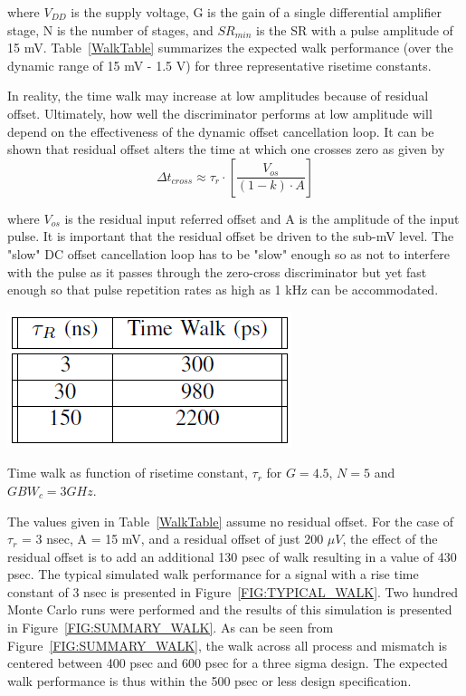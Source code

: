 \documentclass[12pt,oneside,final]{siuethesis}
\theoremstyle{definition}
\begin{document}
where $V_{DD}$ is the supply voltage, G is the gain of a single differential amplifier stage, N is the number of stages, and $SR_{min}$ is  the SR with a pulse amplitude of 15 mV.   Table~\ref{WalkTable} summarizes the expected walk performance (over the dynamic range of 15 mV - 1.5 V) for three representative risetime constants.
\par In reality, the time walk may increase at low amplitudes because of residual offset.  Ultimately, how well the discriminator performs at low amplitude will depend on the effectiveness of the dynamic offset cancellation loop. It can be shown that residual offset alters the time at which one crosses zero as given by
\begin{equation}
\Delta t_{cross} \approx \tau_r \cdot \left[ \frac{V_{os}}{(1-k) \cdot A} \right]
\end{equation}

where $V_{os}$ is the residual input referred offset and A is the amplitude of the input pulse. It is important that the residual offset be driven to the sub-mV level.  The "slow" DC offset cancellation loop has to be "slow" enough so as not to interfere with the pulse as it passes through the zero-cross discriminator but yet fast enough so that pulse repetition rates as high as 1 kHz can be accommodated. 

\begin{table}[htbp!]
 \centering
 \includegraphics[scale=.7,keepaspectratio=true]{./ch4_figures/walk_table.png}
\caption{Time walk as function of risetime constant, $\tau_r$ for $G = 4.5$, $N = 5$ and $GBW_{c} = 3 GHz$.}
\label{WalkTable}
\end{table}

\par The values given in Table~\ref{WalkTable} assume no residual offset.  For the case of $\tau_r$ = 3 nsec, A = 15 mV, and a residual offset of just 200 $\mu V$, the effect of the residual offset is to add an additional 130 psec of walk resulting in a value of 430 psec. The typical simulated walk performance for a signal with a rise time constant of 3 nsec is presented in Figure~\ref{FIG:TYPICAL_WALK}.  Two hundred Monte Carlo runs were performed and the results of this simulation is presented in Figure~\ref{FIG:SUMMARY_WALK}. As can be seen from Figure~\ref{FIG:SUMMARY_WALK}, the walk across all process and mismatch is centered between 400 psec and 600 psec for a three sigma design. The expected walk performance is thus within the 500 psec or less design specification.
\end{document}
